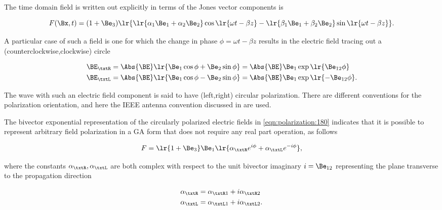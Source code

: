 The time domain field is written out explicitly in terms of the Jones vector components is

\begin{dmath}\label{eqn:polarization:160}
F(\Bx, t) = (1 + \Be_3) \lr{
\lr{ \alpha_1 \Be_1 + \alpha_2 \Be_2 } \cos\lr{ \omega t - \beta z }
-\lr{ \beta_1 \Be_1 + \beta_2 \Be_2 } \sin\lr{ \omega t - \beta z }
}.
\end{dmath}

A particular case of such a field is one for which the
change in phase \( \phi = \omega t - \beta z \) results in the electric field tracing out a (counterclockwise,clockwise) circle

\begin{dmath}\label{eqn:polarization:180}
\begin{aligned}
\BE_\txtR &= \Abs{\BE} \lr{ \Be_1 \cos\phi + \Be_2 \sin\phi } = \Abs{\BE} \Be_1 \exp\lr{  \Be_{12} \phi } \\
\BE_\txtL &= \Abs{\BE} \lr{ \Be_1 \cos\phi - \Be_2 \sin\phi } = \Abs{\BE} \Be_1 \exp\lr{ -\Be_{12} \phi }.
\end{aligned}
\end{dmath}

The wave with such an electric field component is said to have (left,right) circular polarization.  There are different conventions for the polarization orientation, and here the IEEE antenna convention discussed in \citep{balanis1989advanced} are used.

The bivector exponential representation of the circularly polarized electric fields in \cref{eqn:polarization:180} indicates that it is possible to represent arbitrary field polarization in a GA form that does not require any real part operation, as follows

\begin{dmath}\label{eqn:polarization:200}
F = \lr{ 1 + \Be_3 } \Be_1 \lr{ \alpha_\txtR e^{i\phi} + \alpha_\txtL e^{-i\phi} },
\end{dmath}

where the constants \( \alpha_\txtR, \alpha_\txtL \) are both complex with respect to the unit bivector imaginary \( i = \Be_{12} \) representing the plane transverse to the propagation direction

\begin{dmath}\label{eqn:polarization:220}
\begin{aligned}
\alpha_\txtR &= \alpha_{\txtR 1} + i \alpha_{\txtR 2} \\
\alpha_\txtL &= \alpha_{\txtL 1} + i \alpha_{\txtL 2}.
\end{aligned}
\end{dmath}

